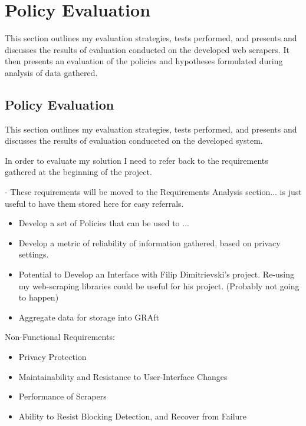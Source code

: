 \chapter{Policy Evaluation}\label{C:us}

This section outlines my evaluation strategies, tests performed, and presents and discusses the results of evaluation conducted on the developed web scrapers. It then presents an evaluation of the policies and hypotheses formulated during analysis of data gathered. 






\section{Policy Evaluation}

This section outlines my evaluation strategies, tests performed, and presents and discusses the results of evaluation conduceted on the developed system. 

In order to evaluate my solution I need to refer back to the requirements gathered at the beginning of the project. 

- These requirements will be moved to the Requirements Analysis section... is just useful to have them stored here for easy referrals. 

\begin{itemize}
\item Develop a set of Policies that can be used to ...
\item Develop a metric of reliability of information gathered, based on privacy settings.
\item Potential to Develop an Interface with Filip Dimitrievski's project. Re-using my web-scraping libraries could be useful for his project. (Probably not going to happen)
\item Aggregate data for storage into GRAft
\end{itemize}

Non-Functional Requirements:
\begin{itemize}
\item Privacy Protection
\item Maintainability and Resistance to User-Interface Changes
\item Performance of Scrapers
\item Ability to Resist Blocking Detection, and Recover from Failure
\end{itemize}

